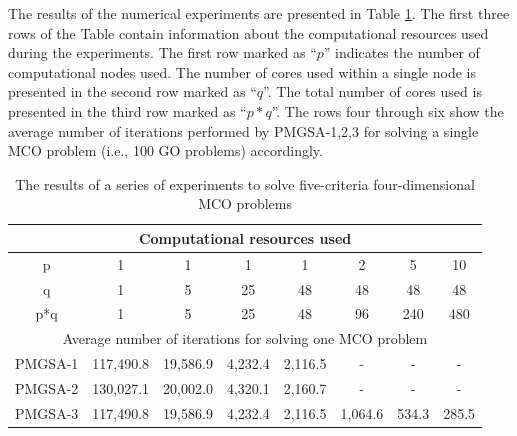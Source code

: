 \documentclass[review]{elsarticle}
\begin{document}
The results of the numerical experiments are presented in Table \ref{tab:2}. The first three rows of the Table contain information about the computational resources used during the experiments. The first row marked as ``$p$'' indicates the number of computational nodes used. The number of cores used within a single node is presented in the second row marked as ``$q$''. The total number of cores used is presented in the third row marked as ``$p*q$''. The rows four through six show the average number of iterations performed by PMGSA-1,2,3 for solving a single MCO problem (i.e., 100 GO problems) accordingly.

\begin{table}[ht]
\centering
\caption{The results of a series of experiments to solve five-criteria four-dimensional MCO problems}
\label{tab:2}
\begin{adjustbox}{max width=\textwidth}
\begin{tabular}{cccccccc}
\hline
\multicolumn{8}{c}{Computational resources used}                                                                                                                           \\ \hline
p                   & 1                     & 1                   & 1                  & 1                  & 2                  & 5                  & 10                 \\
q                   & 1                     & 5                   & 25                 & 48                 & 48                 & 48                 & 48                 \\
p*q                 & 1                     & 5                   & 25                 & 48                 & 96                 & 240                & 480                \\ \hline
\multicolumn{8}{c}{Average number of iterations for solving one   MCO problem}                                                                                             \\ \hline
PMGSA-1             & 117,490.8             & 19,586.9            & 4,232.4            & 2,116.5            & -                  & -                  & -                  \\
PMGSA-2             & 130,027.1             & 20,002.0            & 4,320.1            & 2,160.7            & -                  & -                  & -                  \\
PMGSA-3             & 117,490.8             & 19,586.9            & 4,232.4            & 2,116.5            & 1,064.6            & 534.3              & 285.5              \\ \hline

\end{tabular}
\end{adjustbox}
\end{table}
\end{document}
